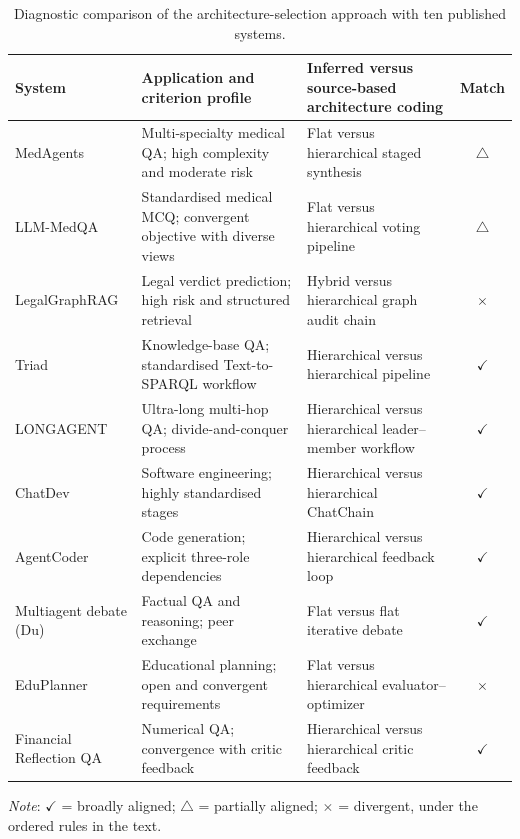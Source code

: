 \documentclass[a4paper,fleqn]{cas-dc}
\begin{document}
\begin{table}[pos=t]
  \centering
  \caption{Diagnostic comparison of the architecture-selection approach with ten published systems.}
  \label{tab:validation}
  \small
  \begin{tabularx}{\textwidth}{p{3.0cm} X p{3.0cm} c}
    \toprule
    \textbf{System} & \textbf{Application and criterion profile} &
    \textbf{Inferred versus source-based architecture coding} & \textbf{Match} \\
    \midrule
    MedAgents \citep{tang2024medagents} & Multi-specialty medical QA; high complexity and moderate risk & Flat versus hierarchical staged synthesis & $\triangle$ \\
    LLM-MedQA \citep{tang2025llmmedqa} & Standardised medical MCQ; convergent objective with diverse views & Flat versus hierarchical voting pipeline & $\triangle$ \\
    LegalGraphRAG \citep{legalgraphrag2026} & Legal verdict prediction; high risk and structured retrieval & Hybrid versus hierarchical graph audit chain & $\times$ \\
    Triad \citep{hu2024triad} & Knowledge-base QA; standardised Text-to-SPARQL workflow & Hierarchical versus hierarchical pipeline & $\checkmark$ \\
    LONGAGENT \citep{zhao2024longagent} & Ultra-long multi-hop QA; divide-and-conquer process & Hierarchical versus hierarchical leader--member workflow & $\checkmark$ \\
    ChatDev \citep{qian2023chatdev} & Software engineering; highly standardised stages & Hierarchical versus hierarchical ChatChain & $\checkmark$ \\
    AgentCoder \citep{huang2023agentcoder} & Code generation; explicit three-role dependencies & Hierarchical versus hierarchical feedback loop & $\checkmark$ \\
    Multiagent debate (Du) \citep{du2024multiagent_debate} & Factual QA and reasoning; peer exchange & Flat versus flat iterative debate & $\checkmark$ \\
    EduPlanner \citep{zhang2024eduplanner} & Educational planning; open and convergent requirements & Flat versus hierarchical evaluator--optimizer & $\times$ \\
    Financial Reflection QA \citep{fatemi2024financialqa} & Numerical QA; convergence with critic feedback & Hierarchical versus hierarchical critic feedback & $\checkmark$ \\
    \bottomrule
  \end{tabularx}
  \footnotesize
  \textit{Note}: $\checkmark$ = broadly aligned; $\triangle$ = partially aligned;
  $\times$ = divergent, under the ordered rules in the text. 
\end{table}
\end{document}
